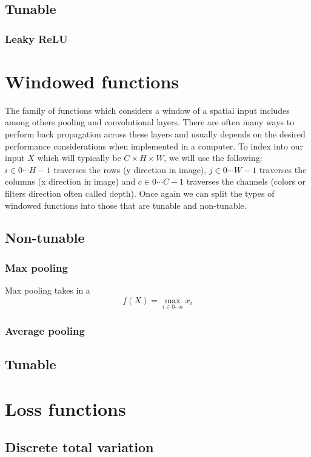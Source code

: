 \documentclass[a4paper]{article}
\begin{document}
\subsection{Tunable}
\subsubsection{Leaky ReLU}

\section{Windowed functions}
The family of functions which considers a window of a spatial input includes among others pooling and convolutional layers. There are often many ways to perform back propagation across these layers and usually depends on the desired performance considerations when implemented in a computer.  To index into our input $X$ which will typically be $C \times H \times W$, we will use the following: $i \in 0 \cdots H-1$ traverses the rows (y direction in image), $j \in 0 \cdots W-1$ traverses the columns (x direction in image) and $c \in 0 \cdots C-1$ traverses the channels (colors or filters direction often called depth). Once again we can split the types of windowed functions into those that are tunable and non-tunable.

\subsection{Non-tunable}
\subsubsection{Max pooling}
Max pooling takes in a 
\begin{equation}
f(X)=\max\limits_{i \in 0 \cdots n} x_i
\end{equation}

\subsubsection{Average pooling}
\subsection{Tunable}
\newpage

\section{Loss functions}
\subsection{Discrete total variation}
\end{document}
